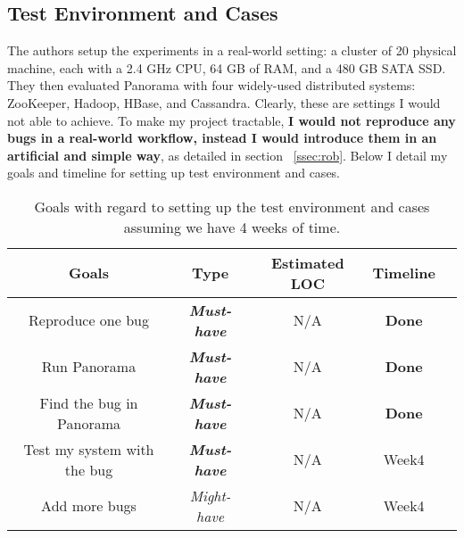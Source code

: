 \subsection{Test Environment and Cases}
The authors setup the experiments in a real-world setting: a cluster of 20 physical machine, each with a 2.4 GHz CPU, 64 GB of RAM, and a 480 GB SATA SSD. They then evaluated Panorama with four widely-used distributed systems: ZooKeeper, Hadoop, HBase, and Cassandra. Clearly, these are settings I would not able to achieve. To make my project tractable, \textbf{I would not reproduce any bugs in a real-world workflow, instead I would introduce them in an artificial and simple way}, as detailed in section ~\ref{ssec:rob}. Below I detail my goals and timeline for setting up test environment and cases. 

\begin{table}[h!]
  \centering
  \begin{tabular}{ |c|c|c|c|c| } 
  \hline
  Goals & Type & Estimated LOC & Timeline \\
  \hline
  Reproduce one bug & \textit{\textbf{Must-have}} & N/A & \textbf{Done}\\ 
  Run Panorama & \textit{\textbf{Must-have}} & N/A & \textbf{Done}\\ 
  Find the bug in Panorama & \textit{\textbf{Must-have}} & N/A & \textbf{Done} \\ 
  Test my system with the bug& \textit{\textbf{Must-have}} & N/A & Week4 \\ 
  Add more bugs& \textit{Might-have} & N/A & Week4 \\ 
  \hline
  \end{tabular}
  \caption{Goals with regard to setting up the test environment and cases assuming we have 4 weeks of time.}
  \label{table:2}
\end{table}



